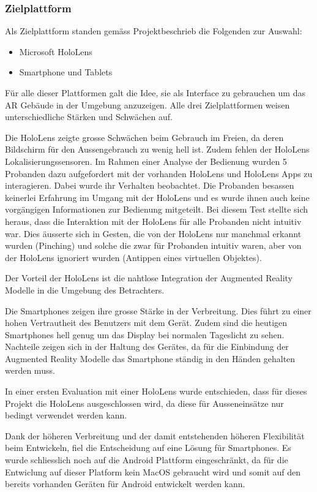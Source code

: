\documentclass[a4paper]{scrreprt}
\begin{document}
\subsubsection{Zielplattform}
Als Zielplattform standen gemäss Projektbeschrieb die Folgenden zur Auswahl:
\begin{itemize}
\item Microsoft HoloLens
\item Smartphone und Tablets
\end{itemize}
Für alle dieser Plattformen galt die Idee, sie als Interface zu gebrauchen um das AR Gebäude in der Umgebung anzuzeigen. Alle drei Zielplattformen weisen unterschiedliche Stärken und Schwächen auf.

Die HoloLens zeigte grosse Schwächen beim Gebrauch im Freien, da deren Bildschirm für den Aussengebrauch zu wenig hell ist.
Zudem fehlen der HoloLens Lokalisierungssensoren. Im Rahmen einer Analyse der Bedienung wurden 5 Probanden dazu aufgefordert mit der vorhanden HoloLens und HoloLens Apps zu interagieren. Dabei wurde ihr Verhalten beobachtet. Die Probanden besassen keinerlei Erfahrung im Umgang mit der HoloLens und es wurde ihnen auch keine vorgängigen Informationen zur Bedienung mitgeteilt. Bei diesem Test stellte sich heraus, dass die Interaktion mit der HoloLens für alle Probanden nicht intuitiv war. Dies äusserte sich in Gesten, die von der HoloLens nur manchmal erkannt wurden (Pinching) und solche die zwar für Probanden intuitiv waren, aber von der HoloLens ignoriert wurden (Antippen eines virtuellen Objektes).

Der Vorteil der HoloLens ist die nahtlose Integration der Augmented Reality Modelle in die Umgebung des Betrachters.

Die Smartphones zeigen ihre grosse Stärke in der Verbreitung. Dies führt zu einer hohen Vertrautheit des Benutzers mit dem Gerät. Zudem sind die heutigen Smartphones hell genug um das Display bei normalen Tageslicht zu sehen.
Nachteile zeigen sich in der Haltung des Gerätes, da für die Einbindung der Augmented Reality Modelle das Smartphone ständig in den Händen gehalten werden muss.

In einer ersten Evaluation mit einer HoloLens wurde entschieden, dass für dieses Projekt die HoloLens ausgeschlossen wird, da diese für Ausseneinsätze nur bedingt verwendet werden kann.

Dank der höheren Verbreitung und der damit entstehenden höheren Flexibilität beim Entwickeln, fiel die Entscheidung auf eine Lösung für Smartphones. Es wurde schliesslich noch auf die Android Plattform eingeschränkt, da für die Entwiclung auf dieser Platform kein MacOS gebraucht wird und somit auf den bereits vorhanden Geräten für Android entwickelt werden kann.
\end{document}
